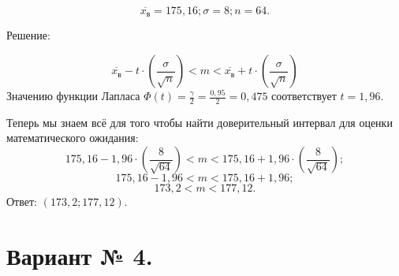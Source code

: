 \documentclass{article}
\begin{document}
\begin{enumerate}
$$\overline{x_\textit{в}}=175,16; \sigma=8; n=64.$$
\begin{center}Решение:\end{center}
$$\overline{x_\textit{в}}-t\cdot\left(\frac{\sigma}{\sqrt{n}}\right)<m<\overline{x_\textit{в}}+t\cdot\left(\frac{\sigma}{\sqrt{n}}\right)$$
Значению функции Лапласа $\Phi(t)=\frac{\gamma}{2}=\frac{0,95}{2}=0,475$ соответствует $t=1,96$.

Теперь мы знаем всё для того чтобы найти доверительный интервал для оценки математического ожидания:
$$175,16-1,96\cdot\left(\frac{8}{\sqrt{64}}\right)<m<175,16+1,96\cdot\left(\frac{8}{\sqrt{64}}\right);$$
$$175,16-1,96<m<175,16+1,96;$$
$$173,2<m<177,12.$$
Ответ: $(173,2;177,12)$.

\end{enumerate}

\section*{Вариант № 4.}
\end{document}
